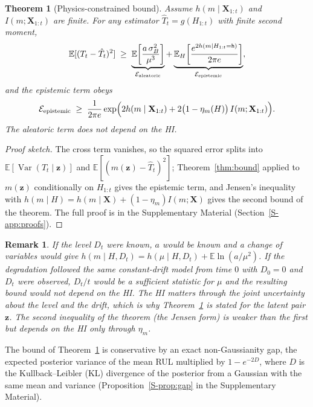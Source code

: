 \documentclass[preprint,12pt]{elsarticle}
\newtheorem{theorem}{Theorem}
\newtheorem{remark}{Remark}
\theoremstyle{definition}
\newcommand{\E}{\mathbb{E}}
\DeclareMathOperator{\Var}{Var}
\begin{document}
\begin{theorem}[Physics-constrained bound]
\label{thm:physics}
Assume $h(m\mid\mathbf{X}_{1:t})$ and $I(m;\mathbf{X}_{1:t})$ are finite. For any estimator $\hat T_t=g(H_{1:t})$ with finite second moment,
\begin{equation}
\E[(T_t-\hat T_t)^2]\;\ge\;\underbrace{\E\!\left[\frac{a\,\sigma_B^2}{\mu^3}\right]}_{\mathcal{E}_{\rm aleatoric}}+\underbrace{\E_{H}\!\left[\frac{e^{2h(m\mid H_{1:t}=\mathsf{h})}}{2\pi e}\right]}_{\mathcal{E}_{\rm epistemic}},
\end{equation}
and the epistemic term obeys
\begin{equation}
\mathcal{E}_{\rm epistemic}\;\ge\;\frac{1}{2\pi e}\exp\!\Big(2h(m\mid\mathbf{X}_{1:t})+2\big(1-\eta_m(H)\big)\,I(m;\mathbf{X}_{1:t})\Big).
\end{equation}
The aleatoric term does not depend on the HI.
\end{theorem}
\begin{proof}[Proof sketch]
The cross term vanishes, so the squared error splits into $\E[\Var(T_t\mid\mathbf z)]$ and $\E[(m(\mathbf z)-\hat T_t)^2]$; Theorem~\ref{thm:bound} applied to $m(\mathbf z)$ conditionally on $H_{1:t}$ gives the epistemic term, and Jensen's inequality with $h(m\mid H)=h(m\mid\mathbf X)+(1-\eta_m)I(m;\mathbf X)$ gives the second bound of the theorem. The full proof is in the Supplementary Material (Section~\ref{S-app:proofs}).
\end{proof}
\begin{remark}
If the level $D_t$ were known, $a$ would be known and a change of variables would give $h(m\mid H,D_t)=h(\mu\mid H,D_t)+\E\ln(a/\mu^2)$. If the degradation followed the same constant-drift model from time $0$ with $D_0=0$ and $D_t$ were observed, $D_t/t$ would be a sufficient statistic for $\mu$ and the resulting bound would not depend on the HI. The HI matters through the joint uncertainty about the level and the drift, which is why Theorem~\ref{thm:physics} is stated for the latent pair $\mathbf z$. The second inequality of the theorem (the Jensen form) is weaker than the first but depends on the HI only through $\eta_m$.
\end{remark}

The bound of Theorem~\ref{thm:physics} is conservative by an exact non-Gaussianity gap, the expected posterior variance of the mean RUL multiplied by $1-e^{-2D}$, where $D$ is the Kullback--Leibler (KL) divergence of the posterior from a Gaussian with the same mean and variance (Proposition~\ref{S-prop:gap} in the Supplementary Material).
\end{document}
